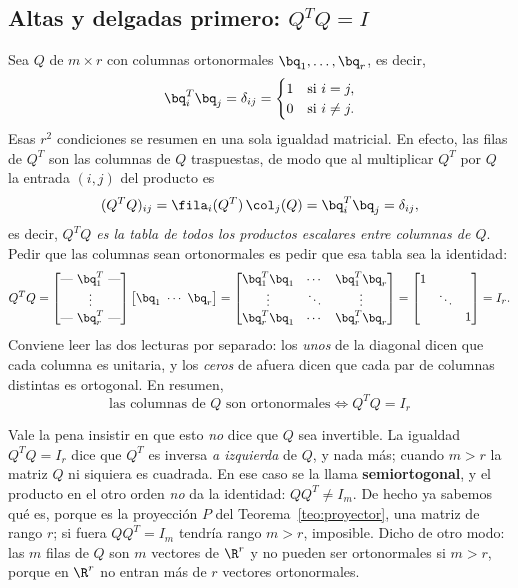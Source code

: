 \subsection*{Altas y delgadas primero: $Q^T Q=I$}

Sea $Q$ de $m\times r$ con columnas ortonormales $\bq_1,\dots,\bq_r$, es
decir,
\[
\bq_i^T\bq_j=\delta_{ij}=
\begin{cases} 1 & \text{si } i=j,\\ 0 & \text{si } i\neq j.\end{cases}
\]
Esas $r^2$ condiciones se resumen en una sola igualdad matricial. En efecto,
las filas de $Q^T$ son las columnas de $Q$ traspuestas, de modo que al
multiplicar $Q^T$ por $Q$ la entrada $(i,j)$ del producto es
\[
(Q^TQ)_{ij}=\fila_i(Q^T)\,\col_j(Q)=\bq_i^T\bq_j=\delta_{ij} ,
\]
es decir, \emph{$Q^TQ$ es la tabla de todos los productos escalares entre
columnas de $Q$}. Pedir que las columnas sean ortonormales es pedir que esa
tabla sea la identidad:
\[
Q^T Q=
\begin{bmatrix}\text{---}\ \bq_1^T\ \text{---}\\ \vdots\\
\text{---}\ \bq_r^T\ \text{---}\end{bmatrix}
\begin{bmatrix}\bq_1\ \cdots\ \bq_r\end{bmatrix}
=\begin{bmatrix}
\bq_1^T\bq_1 & \cdots & \bq_1^T\bq_r\\
\vdots & \ddots & \vdots\\
\bq_r^T\bq_1 & \cdots & \bq_r^T\bq_r
\end{bmatrix}
=\begin{bmatrix}1&&\\&\ddots&\\&&1\end{bmatrix}=I_r .
\]
Conviene leer las dos lecturas por separado: los \emph{unos} de la diagonal
dicen que cada columna es unitaria, y los \emph{ceros} de afuera dicen que
cada par de columnas distintas es ortogonal. En resumen,
\[
\boxed{\ \text{las columnas de } Q \text{ son ortonormales}
\iff Q^TQ=I_r\ }
\]

Vale la pena insistir en que esto \emph{no} dice que $Q$ sea invertible. La
igualdad $Q^TQ=I_r$ dice que $Q^T$ es inversa \emph{a izquierda} de $Q$, y
nada más; cuando $m>r$ la matriz $Q$ ni siquiera es cuadrada. En ese caso se
la llama \textbf{semiortogonal}, y el producto en el otro orden
\emph{no} da la identidad: $QQ^T\neq I_m$. De hecho ya sabemos qué es, porque
es la proyección $P$ del Teorema~\ref{teo:proyector}, una matriz de rango $r$;
si fuera $QQ^T=I_m$ tendría rango $m>r$, imposible. Dicho de otro modo: las
$m$ filas de $Q$ son $m$ vectores de $\R^r$ y no pueden ser ortonormales si
$m>r$, porque en $\R^r$ no entran más de $r$ vectores ortonormales.

